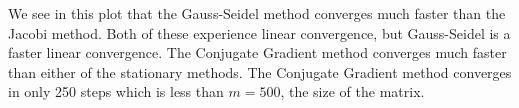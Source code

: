 \documentclass[11pt]{article}
\begin{document}
\begin{enumerate}
        We see in this plot that the Gauss-Seidel method converges much faster
        than the Jacobi method.
        Both of these experience linear convergence, but Gauss-Seidel is a faster
        linear convergence.
        The Conjugate Gradient method converges much faster than either of the
        stationary methods.
        The Conjugate Gradient method converges in only 250 steps which is less
        than $m = 500$, the size of the matrix.
\end{enumerate}
\end{document}
